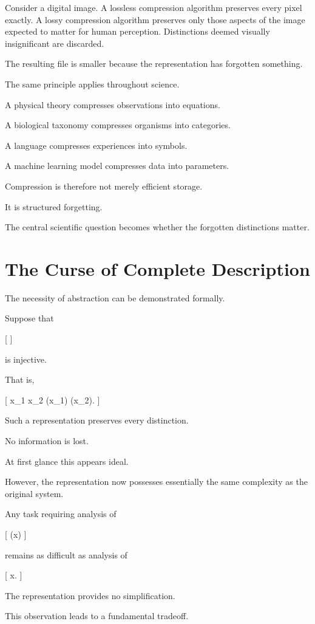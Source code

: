 \documentclass[11pt,oneside,openany]{book}
\begin{document}
Consider a digital image. A lossless compression algorithm preserves every pixel exactly. A lossy compression algorithm preserves only those aspects of the image expected to matter for human perception. Distinctions deemed visually insignificant are discarded.

The resulting file is smaller because the representation has forgotten something.

The same principle applies throughout science.

A physical theory compresses observations into equations.

A biological taxonomy compresses organisms into categories.

A language compresses experiences into symbols.

A machine learning model compresses data into parameters.

Compression is therefore not merely efficient storage.

It is structured forgetting.

The central scientific question becomes whether the forgotten distinctions matter.

\section{The Curse of Complete Description}

The necessity of abstraction can be demonstrated formally.

Suppose that

[
\pi
]

is injective.

That is,

[
x_1 \neq x_2
\Longrightarrow
\pi(x_1)
\neq
\pi(x_2).
]

Such a representation preserves every distinction.

No information is lost.

At first glance this appears ideal.

However, the representation now possesses essentially the same complexity as the original system.

Any task requiring analysis of

[
\pi(x)
]

remains as difficult as analysis of

[
x.
]

The representation provides no simplification.

This observation leads to a fundamental tradeoff.
\end{document}
